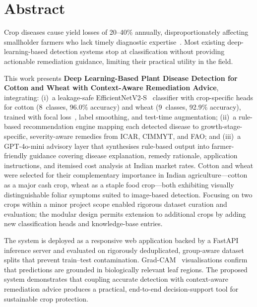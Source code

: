 \documentclass[12pt,a4paper]{report}
\begin{document}
\newpage

\chapter*{Abstract}

Crop diseases cause yield losses of 20--40\% annually, disproportionately affecting smallholder farmers who lack timely diagnostic expertise~\cite{b8}. Most existing deep-learning-based detection systems stop at classification without providing actionable remediation guidance, limiting their practical utility in the field.

This work presents \textbf{Deep Learning-Based Plant Disease Detection for Cotton and Wheat with Context-Aware Remediation Advice}, integrating: (i)~a leakage-safe EfficientNetV2-S~\cite{b1} classifier with crop-specific heads for cotton (8~classes, 96.0\% accuracy) and wheat (9~classes, 92.9\% accuracy), trained with focal loss~\cite{b2}, label smoothing, and test-time augmentation; (ii)~a rule-based recommendation engine mapping each detected disease to growth-stage-specific, severity-aware remedies from ICAR, CIMMYT, and FAO; and (iii)~a GPT-4o-mini advisory layer that synthesises rule-based output into farmer-friendly guidance covering disease explanation, remedy rationale, application instructions, and itemised cost analysis at Indian market rates. Cotton and wheat were selected for their complementary importance in Indian agriculture---cotton as a major cash crop, wheat as a staple food crop---both exhibiting visually distinguishable foliar symptoms suited to image-based detection. Focusing on two crops within a minor project scope enabled rigorous dataset curation and evaluation; the modular design permits extension to additional crops by adding new classification heads and knowledge-base entries.

The system is deployed as a responsive web application backed by a FastAPI inference server and evaluated on rigorously deduplicated, group-aware dataset splits that prevent train--test contamination. Grad-CAM~\cite{b3} visualisations confirm that predictions are grounded in biologically relevant leaf regions. The proposed system demonstrates that coupling accurate detection with context-aware remediation advice produces a practical, end-to-end decision-support tool for sustainable crop protection.

\setcounter{tocdepth}{2}
\tableofcontents
\thispagestyle{plain}

\listoffigures
{}
\listoftables
{}
\newpage
\end{document}
